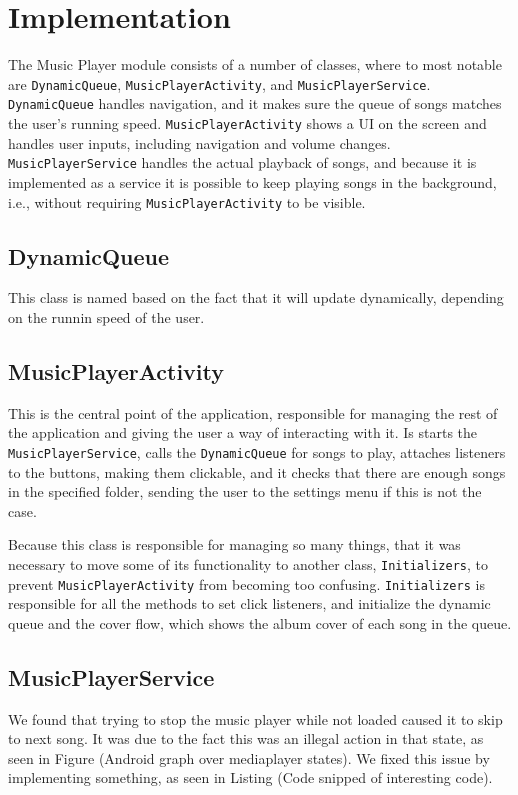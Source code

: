 \section{Implementation}
The Music Player module consists of a number of classes, where to most notable are \texttt{DynamicQueue}, \texttt{MusicPlayerActivity}, and \texttt{MusicPlayerService}. \texttt{DynamicQueue} handles navigation, and it makes sure the queue of songs matches the user's running speed. \texttt{MusicPlayerActivity} shows a UI on the screen and handles user inputs, including navigation and volume changes. \texttt{MusicPlayerService} handles the actual playback of songs, and because it is implemented as a service it is possible to keep playing songs in the background, i.e., without requiring \texttt{MusicPlayerActivity} to be visible.

\subsection{DynamicQueue}
This class is named based on the fact that it will update dynamically, depending on the runnin speed of the user.

\subsection{MusicPlayerActivity}
This is the central point of the application, responsible for managing the rest of the application and giving the user a way of interacting with it. Is starts the \texttt{MusicPlayerService}, calls the \texttt{DynamicQueue} for songs to play, attaches listeners to the buttons, making them clickable, and it checks that there are enough songs in the specified folder, sending the user to the settings menu if this is not the case.

Because this class is responsible for managing so many things, that it was necessary to move some of its functionality to another class, \texttt{Initializers}, to prevent \texttt{MusicPlayerActivity} from becoming too confusing. \texttt{Initializers} is responsible for all the methods to set click listeners, and initialize the dynamic queue and the cover flow, which shows the album cover of each song in the queue.

\subsection{MusicPlayerService} 

 We found that trying to stop the music player while not loaded caused it to skip to next song. It was due to the fact this was an illegal action in that state, as seen in Figure (Android graph over mediaplayer states). We fixed this issue by implementing something, as seen in Listing (Code snipped of interesting code).